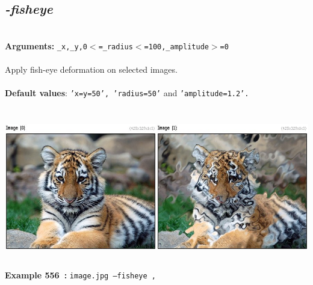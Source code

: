 \documentclass[a4paper,11pt,twoside]{book}
\begin{document}
\subsection{\emph{-fisheye} }\vspace*{-0.5em}
~\\\textbf{Arguments: } 
{\small \texttt{\_x,\_y,0$<$=\_radius$<$=100,\_amplitude$>$=0}}\\~\\
Apply fish-eye deformation on selected images.
~\\~\\\textbf{Default values}: {\small \texttt{'x=y=50', 'radius=50'} and \texttt{'amplitude=1.2'.}}
\begin{center}\includegraphics[keepaspectratio=true,height=7cm,width=\textwidth]{img/gmic_def556.jpg}\\
{\footnotesize \textbf{Example 556~:} \texttt{image.jpg --fisheye ,}}
\end{center}
\end{document}
